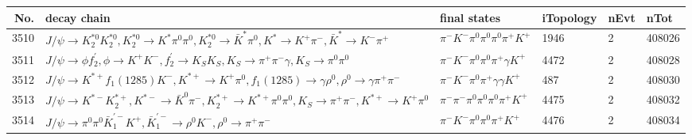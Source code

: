 \begin{table}[htbp] 
\begin{center}
\begin{small}
\begin{tabular}{rlllll}\hline\hline
 No. & decay chain & final states &  iTopology & nEvt & nTot \\\hline
3510&$J/\psi       \rightarrow K_2^{*0}       K_2^{*0}       , K_2^{*0}        \rightarrow K^{*}          \pi^{0}        \pi^{0}        , K_2^{*0}        \rightarrow \bar{K}^{*}   \pi^{0}        , K^{*}           \rightarrow K^{+}          \pi^{-}        , \bar{K}^{*}    \rightarrow K^{-}          \pi^{+}        $&$\pi^{-}        K^{-}          \pi^{0}        \pi^{0}        \pi^{0}        \pi^{+}        K^{+}          $& 1946&    2&408026\\
3511&$J/\psi       \rightarrow \phi           f_2^{'}       , \phi            \rightarrow K^{+}          K^{-}          , f_2^{'}        \rightarrow K_{S}          K_{S}          , K_{S}           \rightarrow \pi^{+}        \pi^{-}        \gamma       , K_{S}           \rightarrow \pi^{0}        \pi^{0}        $&$\pi^{-}        K^{-}          \pi^{0}        \pi^{0}        \pi^{+}        \gamma       K^{+}          $& 4472&    2&408028\\
3512&$J/\psi       \rightarrow K^{*+}         f_{1}(1285)    K^{-}          , K^{*+}          \rightarrow K^{+}          \pi^{0}        , f_{1}(1285)     \rightarrow \gamma       \rho^{0}      , \rho^{0}       \rightarrow \gamma       \pi^{+}        \pi^{-}        $&$\pi^{-}        K^{-}          \pi^{0}        \pi^{+}        \gamma       \gamma       K^{+}          $&  487&    2&408030\\
3513&$J/\psi       \rightarrow K^{*-}         K_2^{*+}       , K^{*-}          \rightarrow \bar{K}^{0}   \pi^{-}        , K_2^{*+}        \rightarrow K^{*+}         \pi^{0}        \pi^{0}        , K_{S}           \rightarrow \pi^{+}        \pi^{-}        , K^{*+}          \rightarrow K^{+}          \pi^{0}        $&$\pi^{-}        \pi^{-}        \pi^{0}        \pi^{0}        \pi^{0}        \pi^{+}        K^{+}          $& 4475&    2&408032\\
3514&$J/\psi       \rightarrow \pi^{0}        \pi^{0}        \bar{K}_1^{'-}K^{+}          , \bar{K}_1^{'-} \rightarrow \rho^{0}      K^{-}          , \rho^{0}       \rightarrow \pi^{+}        \pi^{-}        $&$\pi^{-}        K^{-}          \pi^{0}        \pi^{0}        \pi^{+}        K^{+}          $& 4476&    2&408034\\

\end{tabular}
\end{small}
\end{center}
\end{table}
